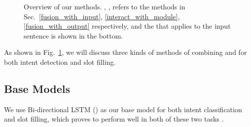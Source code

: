 \begin{figure}[!t]
\centering
{}
\hspace{.5in}
\caption{Overview of our methods. , ,  refers to the methods in
Sec.~\ref{fusion_with_input}, \ref{interact_with_module}, \ref{fusion_with_output} respectively, and the \RE that applies to the input
sentence is shown in the bottom.}
\label{fig_overview}
\end{figure}

As shown in Fig.~\ref{fig_overview}, we will discuss three kinds of methods of combining \NN and \RE for both intent detection and slot filling.

\subsection{Base Models}
We use Bi-directional LSTM (\BLSTM) as our base \NN model for both intent classification and slot filling, which proves to perform well in both of these two tasks \cite{liu2016attention}.

